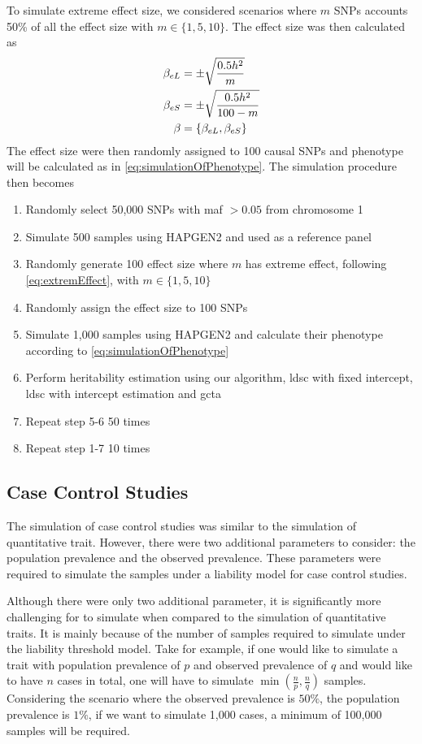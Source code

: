 \documentclass[12pt]{scrbook}
\begin{document}
To simulate extreme effect size, we considered scenarios where $m$ \glspl{SNP} accounts 50\% of all the effect size with $m\in\{1,5,10\}$.
The effect size was then calculated as
\begin{align}
\beta_{eL} &= \pm\sqrt{\frac{0.5h^2}{m}} \notag\\
\beta_{eS} &= \pm\sqrt{\frac{0.5h^2}{100-m}} \notag\\
\beta &= \{\beta_{eL}, \beta_{eS}\}
\label{eq:extremEffect}
\end{align}
The effect size were then randomly assigned to 100 causal \glspl{SNP} and phenotype will be calculated as in \cref{eq:simulationOfPhenotype}.
The simulation procedure then becomes
\begin{enumerate}
	\item Randomly select 50,000 \glspl{SNP} with \gls{maf} $>0.05$ from chromosome 1
	\item Simulate 500 samples using HAPGEN2 and used as a reference panel
	\item Randomly generate 100 effect size where $m$ has extreme effect, following \cref{eq:extremEffect}, with $m\in\{1,5,10\}$
	\item Randomly assign the effect size to 100 \glspl{SNP}
	\item Simulate 1,000 samples using HAPGEN2 and calculate their phenotype according to \cref{eq:simulationOfPhenotype}
	\item Perform heritability estimation using our algorithm, \gls{ldsc} with fixed intercept, \gls{ldsc} with intercept estimation and \gls{gcta}
	\item Repeat step 5-6 50 times
	\item Repeat step 1-7 10 times
\end{enumerate}

\subsection{Case Control Studies}
The simulation of case control studies was similar to the simulation of quantitative trait. 
However, there were two additional parameters to consider: the population prevalence and the observed prevalence.
These parameters were required to simulate the samples under a liability model for case control studies.

Although there were only two additional parameter, it is significantly more challenging for to simulate when compared to the simulation of quantitative traits.
It is mainly because of the number of samples required to simulate under the liability threshold model.
Take for example, if one would like to simulate a trait with population prevalence of $p$ and observed prevalence of $q$ and would like to have $n$ cases in total, one will have to simulate $\min(\frac{n}{p}, \frac{n}{q})$ samples.
Considering the scenario where the observed prevalence is $50\%$, the population prevalence is $1\%$, if we want to simulate 1,000 cases, a minimum of 100,000 samples will be required.
\end{document}
